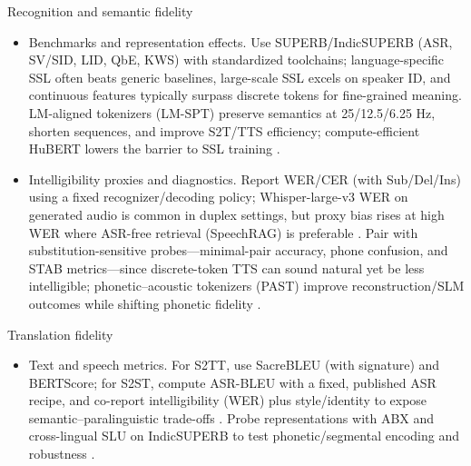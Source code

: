 \documentclass{article}
\begin{document}
Recognition and semantic fidelity
\begin{itemize}
  \item Benchmarks and representation effects. Use SUPERB/IndicSUPERB (ASR, SV/SID, LID, QbE, KWS) with standardized toolchains; language-specific SSL often beats generic baselines, large-scale SSL excels on speaker ID, and continuous features typically surpass discrete tokens for fine-grained meaning. LM-aligned tokenizers (LM-SPT) preserve semantics at 25/12.5/6.25 Hz, shorten sequences, and improve S2T/TTS efficiency; compute-efficient HuBERT lowers the barrier to SSL training \cite{entry2025indicsuperbspeechprocessinguniversalperf,jo2025lmsptalignedsemanticdistillationspeechto,wang2024comparativestudydiscretespeechtokenssema,chen2023reducingbarriersselfsupervisedlearninghu}.
  \item Intelligibility proxies and diagnostics. Report WER/CER (with Sub/Del/Ins) using a fixed recognizer/decoding policy; Whisper-large-v3 WER on generated audio is common in duplex settings, but proxy bias rises at high WER where ASR-free retrieval (SpeechRAG) is preferable \cite{ma2024languagemodelcanlistenwhilespeaking,min2025speechretrievalaugmentedgenerationwithou,maimon2025salmonsuiteacousticlanguagemodelevaluati}. Pair with substitution-sensitive probes---minimal-pair accuracy, phone confusion, and STAB metrics---since discrete-token TTS can sound natural yet be less intelligible; phonetic--acoustic tokenizers (PAST) improve reconstruction/SLM outcomes while shifting phonetic fidelity \cite{vashishth2024stabspeechtokenizerassessmentbenchmark,har-tuv2025pastphoneticacousticspeechtokenizer,tseng2025evaluationllmsspeechisoftenflawedtestset,wang2024evaluatingtextspeechsynthesislargediscre}.
\end{itemize}

Translation fidelity
\begin{itemize}
  \item Text and speech metrics. For S2TT, use SacreBLEU (with signature) and BERTScore; for S2ST, compute ASR-BLEU with a fixed, published ASR recipe, and co-report intelligibility (WER) plus style/identity to expose semantic--paralinguistic trade-offs \cite{peng2024mslms2stmultitaskspeechlanguagemodeltext,jo2025lmsptalignedsemanticdistillationspeechto,chen2023reducingbarriersselfsupervisedlearninghu,entry2025indicsuperbspeechprocessinguniversalperf}. Probe representations with ABX and cross-lingual SLU on IndicSUPERB to test phonetic/segmental encoding and robustness \cite{fily2024establishingdegreesclosenessbetweenaudio,entry2025indicsuperbspeechprocessinguniversalperf}.
\end{itemize}
\end{document}
